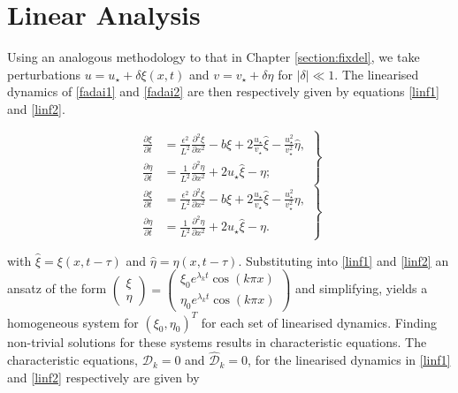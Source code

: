 \section{Linear Analysis}

Using an analogous methodology to that in Chapter \ref{section:fixdel}, we take perturbations $u=u_\star+\delta\xi(x,t)$ and $v=v_\star+\delta\eta$ for $|\delta|\ll1$. The linearised dynamics of \eqref{fadai1} and \eqref{fadai2} are then respectively given by equations \eqref{linf1} and \eqref{linf2}.

\begin{multicols}{2}
\begin{equation}\label{linf1}
    \left.\begin{split}
\frac{\partial \xi}{\partial t}&=\frac{\epsilon^2}{L^2}\frac{\partial^2 \xi}{\partial x^2}-b\xi+2\frac{u_\star}{v_\star}\hat{\xi}-\frac{u_\star^2}{v_\star^2}\hat{\eta},\\
\frac{\partial \eta}{\partial t}&=\frac{1}{L^2}\frac{\partial^2 \eta}{\partial x^2}+2u_\star\hat{\xi}-\eta;
\end{split}\right\}
\end{equation}\break
\begin{equation}
    \left.\begin{split}
\frac{\partial \xi}{\partial t}&=\frac{\epsilon^2}{L^2}\frac{\partial^2 \xi}{\partial x^2}-b\xi+2\frac{u_\star}{v_\star}\hat{\xi}-\frac{u_\star^2}{v_\star^2}\eta,\\
\frac{\partial \eta}{\partial t}&=\frac{1}{L^2}\frac{\partial^2 \eta}{\partial x^2}+2u_\star\hat{\xi}-\eta.\label{linf2}
\end{split}\right\}
\end{equation}
\end{multicols}
with $\hat{\xi}=\xi(x,t-\tau)$ and $\hat{\eta}=\eta(x,t-\tau)$. Substituting into \eqref{linf1} and \eqref{linf2} an ansatz of the form $\begin{pmatrix}\xi\\ \eta\end{pmatrix}=\begin{pmatrix}\xi_0e^{\lambda_kt}\cos(k\pi x)\\\eta_0e^{\lambda_kt}\cos(k\pi x)\end{pmatrix}$ and simplifying, yields a homogeneous system for $(\xi_0,\eta_0)^T$ for each set of linearised dynamics. Finding non-trivial solutions for these systems results in characteristic equations. The characteristic equations, $\mathcal{D}_k=0$ and $\hat{\mathcal{D}}_k=0$, for the linearised dynamics in \eqref{linf1} and \eqref{linf2} respectively are given by
